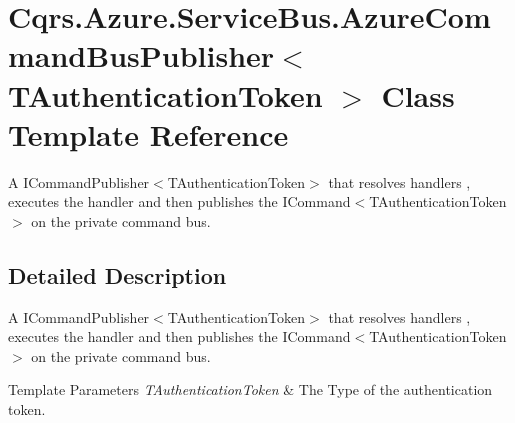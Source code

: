 \hypertarget{classCqrs_1_1Azure_1_1ServiceBus_1_1AzureCommandBusPublisher}{}\section{Cqrs.\+Azure.\+Service\+Bus.\+Azure\+Command\+Bus\+Publisher$<$ T\+Authentication\+Token $>$ Class Template Reference}
\label{classCqrs_1_1Azure_1_1ServiceBus_1_1AzureCommandBusPublisher}


A I\+Command\+Publisher$<$\+T\+Authentication\+Token$>$ that resolves handlers , executes the handler and then publishes the I\+Command$<$\+T\+Authentication\+Token$>$ on the private command bus.  




\subsection{Detailed Description}
A I\+Command\+Publisher$<$\+T\+Authentication\+Token$>$ that resolves handlers , executes the handler and then publishes the I\+Command$<$\+T\+Authentication\+Token$>$ on the private command bus. 


\begin{DoxyTemplParams}{Template Parameters}
{\em T\+Authentication\+Token} & The Type of the authentication token.\\
\hline
\end{DoxyTemplParams}

